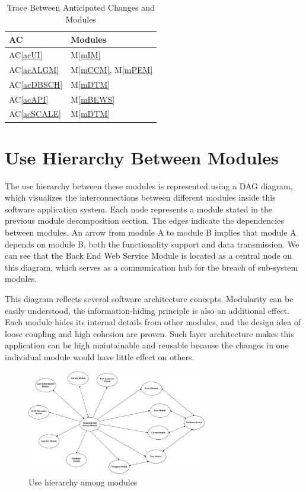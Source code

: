 \documentclass[12pt, titlepage]{article}
\newcommand{\acref}[1]{AC\ref{#1}}
\newcommand{\mref}[1]{M\ref{#1}}
\begin{document}
\begin{table}[H]
\centering
\begin{tabular}{p{} p{}}
\toprule
\textbf{AC} & \textbf{Modules}\\
\midrule
\acref{acUI} & \mref{mIM}\\
\acref{acALGM} & \mref{mCCM}, \mref{mPEM}\\
\acref{acDBSCH} & \mref{mDTM}\\
\acref{acAPI} & \mref{mBEWS}\\
\acref{acSCALE} & \mref{mDTM} \\
\bottomrule
\end{tabular}
\caption{Trace Between Anticipated Changes and Modules}
\label{TblACT}
\end{table}

\section{Use Hierarchy Between Modules} \label{SecUse}
The use hierarchy between these modules is represented using a DAG diagram, which visualizes the interconnections between different modules inside this software application system. Each node represents a module stated in the previous module decomposition section. The edges indicate the dependencies between modules. An arrow from module A to module B implies that module A depends on module B, both the functionality support and data transmission. We can see that the Back End Web Service Module is located as a central node on this diagram, which serves as a communication hub for the breach of sub-system modules.

This diagram reflects several software architecture concepts. Modularity can be easily understood, the information-hiding principle is also an additional effect.  Each module hides its internal details from other modules, and the design idea of loose coupling and high cohesion are proven. Such layer architecture makes this application can be high maintainable and reusable because the changes in one individual module would have little effect on others. 
\begin{figure}[H]
\centering
\includegraphics[width=0.7\textwidth]{UseHierachy.png}
\caption{Use hierarchy among modules}
\label{FigUH}
\end{figure}
\end{document}
